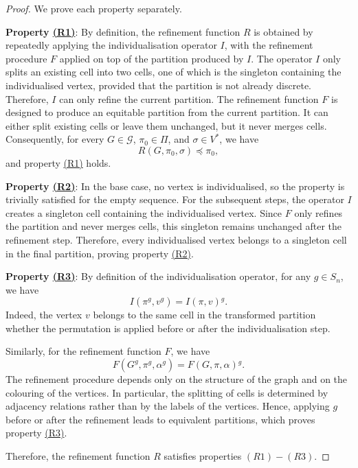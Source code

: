   \begin{proof}
    We prove each property separately.
  
    \textbf{Property \hyperref[RefinementRule:finer]{(R1)}}:
    By definition, the refinement function $R$ is obtained by repeatedly applying the individualisation operator $I$, with the refinement procedure $F$ applied on top of the partition produced by $I$. The operator $I$ only splits an existing cell into two cells, one of which is the singleton containing the individualised vertex, provided that the partition is not already discrete. Therefore, $I$ can only refine the current partition. The refinement function $F$ is designed to produce an equitable partition from the current partition. It can either split existing cells or leave them unchanged, but it never merges cells. Consequently, for every
    $G \in \mathcal{G}$, $\pi_0 \in \Pi$, and $\sigma \in V^*$, we have
    \[
      R(G,\pi_0,\sigma) \preccurlyeq \pi_0,
    \]
    and property \hyperref[RefinementRule:finer]{(R1)} holds.
  
    \textbf{Property \hyperref[RefinementRule:singleton]{(R2)}}:
    In the base case, no vertex is individualised, so the property is trivially
    satisfied for the empty sequence. For the subsequent steps, the operator
    $I$ creates a singleton cell containing the individualised vertex. Since $F$
    only refines the partition and never merges cells, this singleton remains
    unchanged after the refinement step. Therefore, every individualised vertex
    belongs to a singleton cell in the final partition, proving property
    \hyperref[RefinementRule:singleton]{(R2)}.
  
    \textbf{Property \hyperref[RefinementRule:equivariance]{(R3)}}:
    By definition of the individualisation operator, for any $g \in S_n$, we
    have
    \[
      I(\pi^g,v^g)=I(\pi,v){^g}.
    \]
    Indeed, the vertex $v$ belongs to the same cell in the transformed partition
    whether the permutation is applied before or after the individualisation
    step.
  
    Similarly, for the refinement function $F$, we have
    \[
      F(G^g,\pi^g,\alpha^g)=F(G,\pi,\alpha){^g}.
    \]
    The refinement procedure depends only on the structure of the graph and on
    the colouring of the vertices. In particular, the splitting of cells is
    determined by adjacency relations rather than by the labels of the vertices.
    Hence, applying $g$ before or after the refinement leads to equivalent partitions, which proves property
    \hyperref[RefinementRule:equivariance]{(R3)}.
  
    Therefore, the refinement function $R$ satisfies properties $\hyperref[RefinementRule:finer]{(R1)}-\hyperref[RefinementRule:equivariance]{(R3)}$.
  \end{proof}

